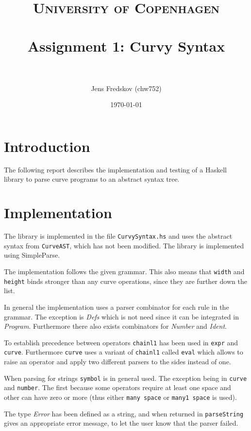 \documentclass[a4paper, 11pt]{article}
\title{ 
\normalfont\normalsize 
\textsc{University of Copenhagen} \\ [25pt] %
\horrule{0.5pt} \\[0.4cm] %
\huge Assignment 1: Curvy Syntax \\ %
\horrule{2pt} \\[0.5cm] %
}
\author{Jens Fredskov (chw752)} %
\date{\normalsize\today} %
\begin{document}
\maketitle

\section{Introduction} %
\label{sec:introduction}

The following report describes the implementation and testing of a Haskell library to parse curve programs to an abstract syntax tree.


\section{Implementation} %
\label{sec:implementation}

The library is implemented in the file \texttt{CurvySyntax.hs} and uses the abstract syntax from \texttt{CurveAST}, which has not been modified. The library is implemented using SimpleParse.

The implementation follows the given grammar. This also means that \texttt{width} and \texttt{height} binds stronger than any curve operations, since they are further down the list.

In general the implementation uses a parser combinator for each rule in the grammar. The exception is \emph{Defs} which is not need since it can be integrated in \emph{Program}. Furthermore there also exists combinators for \emph{Number} and \emph{Ident}.

To establish precedence between operators \texttt{chainl1} has been used in \texttt{expr} and \texttt{curve}. Furthermore \texttt{curve} uses a variant of \texttt{chainl1} called \texttt{eval} which allows to raise an operator and apply two different parsers to the sides instead of one.

When parsing for strings \texttt{symbol} is in general used. The exception being in \texttt{curve} and \texttt{number}. The first because some operators require at least one space and other can have zero or more (thus either \texttt{many space} or \texttt{many1 space} is used).

The type \emph{Error} has been defined as a string, and when returned in \texttt{parseString} gives an appropriate error message, to let the user know that the parser failed.

\end{document}
